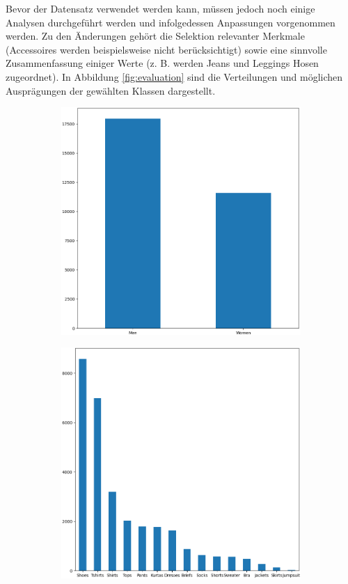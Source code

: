 Bevor der Datensatz verwendet werden kann, müssen jedoch noch einige Analysen durchgeführt werden und infolgedessen Anpassungen vorgenommen werden. Zu den Änderungen gehört die Selektion relevanter Merkmale (Accessoires werden beispielsweise nicht berücksichtigt) sowie eine sinnvolle Zusammenfassung einiger Werte (z. B. werden Jeans und Leggings Hosen zugeordnet). In Abbildung \ref{fig:evaluation} sind die Verteilungen und möglichen Ausprägungen der gewählten Klassen dargestellt.

\begin{figure}[H]
    \centering
    \begin{subfigure}[c]{0.32\linewidth}
        \includegraphics[width=\linewidth]{images/gender.png}
    \end{subfigure}
    \begin{subfigure}[c]{0.32\linewidth}
        \includegraphics[width=\linewidth]{images/articleType.png}

\end{subfigure}
\end{figure}
